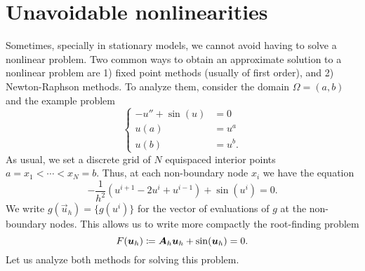 \section{Unavoidable nonlinearities}
Sometimes, specially in stationary models, we cannot avoid having to solve a nonlinear problem. Two common ways to obtain an approximate solution to a nonlinear problem are 1) fixed point methods (usually of first order), and 2) Newton-Raphson methods. To analyze them, consider the domain $\Omega=(a,b)$ and the example problem
\begin{equation}
    \begin{cases}
        -u'' + \sin(u) &= 0\\
        u(a) &= u^a\\
        u(b) &= u^b.
    \end{cases}
\end{equation}
As usual, we set a discrete grid of $N$ equispaced interior points $a=x_1<\cdots<x_N=b$. Thus, at each non-boundary node $x_i$ we have the equation
\begin{equation}
    -\frac{1}{h^2}(u^{i+1}-2u^i+u^{i-1}) + \sin(u^i) = 0.
\end{equation}
We write $g(\vec u_h) = \{g(u^i)\}$ for the vector of evaluations of $g$ at the non-boundary nodes. This allows us to write more compactly the root-finding problem
\begin{equation}
    F(\vec u_h) \coloneqq  \mat A_h \vec u_h + \sin(\vec u_h) = 0.
\end{equation}
Let us analyze both methods for solving this problem.
